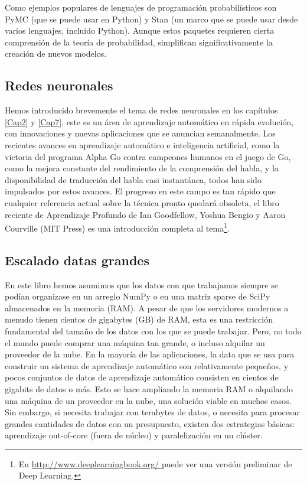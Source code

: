 Como ejemplos populares de lenguajes de programación probabilísticos son
PyMC  (que se puede usar en Python) y Stan (un marco que se puede usar desde
varios lenguajes, incluido Python).   Aunque estos paquetes requieren cierta comprensión de la teoría de probabilidad, simplifican significativamente la creación de nuevos modelos.


\subsection{Redes neuronales}


Hemos  introducido brevemente el tema de  redes neuronales en los capítulos \ref{Cap2} y \ref{Cap7}, este es un área de aprendizaje automático en rápida evolución, con innovaciones y nuevas aplicaciones que se anuncian semanalmente.  Los recientes avances en aprendizaje automático e inteligencia artificial, como la victoria del programa Alpha Go contra campeones humanos en el juego de Go, como la mejora constante del rendimiento de la comprensión del habla, y la disponibilidad de traducción del habla  casi instantánea, todos han sido impulsados por estos avances.
El  progreso en este campo es tan rápido que cualquier referencia actual sobre la técnica pronto quedará obsoleta, el libro reciente de Aprendizaje Profundo de Ian Goodfellow, Yoshua Bengio y Aaron Courville (MIT Press) es una introducción completa al tema\footnote{En      
\href{http://www.deeplearningbook.org/}{\textcolor{vino}{http://www.deeplearningbook.org/} }  puede ver una versión preliminar de Deep Learning.}.


\subsection{Escalado  datas  grandes}    %

En este libro  hemos  asumimos que los datos con  que trabajamos siempre se podían organizase en un arreglo NumPy o en una matriz  sparse  de SciPy  almacenados  en la memoria (RAM). A pesar de que los servidores modernos a menudo tienen cientos de gigabytes (GB) de RAM, esta es una restricción fundamental del tamaño de los datos con los que se puede trabajar. Pero, no todo el mundo puede  comprar una máquina tan grande, o incluso alquilar  un proveedor de la nube. En la mayoría de las aplicaciones, la data  que se usa para construir un sistema de aprendizaje automático son relativamente pequeños,  y pocos conjuntos de datos de aprendizaje automático consisten en cientos de gigabits de datos o más. Esto se hace ampliando la memoria  RAM o alquilando una máquina de un proveedor en la nube,   una solución viable en muchos casos. Sin embargo, si necesita trabajar con terabytes de datos, o necesita  para  procesar grandes cantidades de datos con un presupuesto,  existen dos estrategias básicas: aprendizaje out-of-core (fuera de núcleo) y paralelización en un clúster.\\
   
